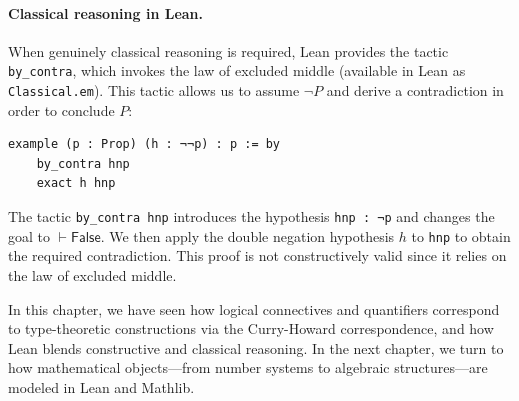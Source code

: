 \paragraph{Classical reasoning in Lean.}
When genuinely classical reasoning is required, Lean provides the
tactic \lstinline[language=lean]|by_contra|, which invokes the law of
excluded middle (available in Lean as
\lstinline[language=lean]|Classical.em|).
This tactic allows us to assume $\lnot P$ and derive a
contradiction in order to conclude $P$:

\begin{example}
  \begin{lstlisting}[language=lean]
  example (p : Prop) (h : ¬¬p) : p := by
    by_contra hnp
    exact h hnp
  \end{lstlisting}
  The tactic \lstinline[language=lean]|by_contra hnp| introduces the
  hypothesis \lstinline[language=lean]|hnp : ¬p| and changes the goal
  to $\vdash \mathsf{False}$.
  We then apply the double negation hypothesis $h$ to
  \lstinline[language=lean]|hnp| to obtain the required
  contradiction.
  This proof is not constructively valid since it relies on the law of
  excluded middle.
\end{example}

In this chapter, we have seen how logical connectives and quantifiers
correspond to type-theoretic constructions via the Curry-Howard
correspondence, and how Lean blends constructive and classical
reasoning.
In the next chapter, we turn to how mathematical objects---from
number systems to algebraic structures---are modeled in Lean and
Mathlib.